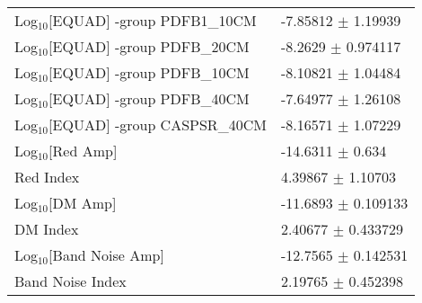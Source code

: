\documentclass{article}
\begin{document}
\begin{table*}
\begin{tabular}{ll}
Log$_{10}$[EQUAD] -group PDFB1_10CM \dotfill & -7.85812 $\pm$ 1.19939  \\ 
Log$_{10}$[EQUAD] -group PDFB_20CM \dotfill & -8.2629 $\pm$ 0.974117  \\ 
Log$_{10}$[EQUAD] -group PDFB_10CM \dotfill & -8.10821 $\pm$ 1.04484  \\ 
Log$_{10}$[EQUAD] -group PDFB_40CM \dotfill & -7.64977 $\pm$ 1.26108  \\ 
Log$_{10}$[EQUAD] -group CASPSR_40CM \dotfill & -8.16571 $\pm$ 1.07229  \\ 
Log$_{10}$[Red Amp] \dotfill & -14.6311 $\pm$ 0.634  \\ 
Red Index \dotfill & 4.39867 $\pm$ 1.10703  \\ 
Log$_{10}$[DM Amp] \dotfill & -11.6893 $\pm$ 0.109133  \\ 
DM Index \dotfill & 2.40677 $\pm$ 0.433729  \\ 
Log$_{10}$[Band Noise Amp] \dotfill & -12.7565 $\pm$ 0.142531  \\ 
Band Noise Index \dotfill & 2.19765 $\pm$ 0.452398  \\ 
\hline
\end{tabular}
\label{Table:J1600-3053}
\end{table*} 
\end{document}
